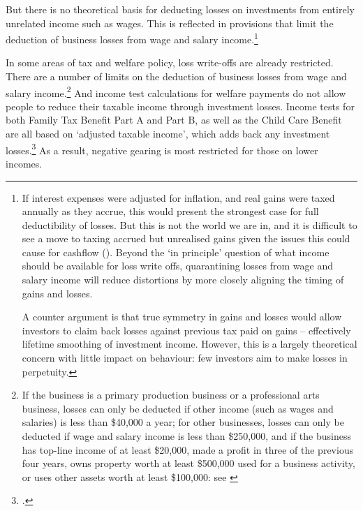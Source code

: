 But there is no theoretical basis for deducting losses on investments from entirely unrelated income such as wages. This is reflected in provisions that limit the deduction of business losses from wage and salary income.\footnote{If interest expenses were adjusted for inflation, and real gains were taxed annually as they accrue, this would present the strongest case for full deductibility of losses. But this is not the world we are in, and it is difficult to see a move to taxing accrued but unrealised gains given the issues this could cause for cashflow (). Beyond the ‘in principle’ question of what income should be available for loss write offs, quarantining losses from wage and salary income will reduce distortions by more closely aligning the timing of gains and losses.

A counter argument is that true symmetry in gains and losses would allow investors to claim back losses against previous tax paid on gains -- effectively lifetime smoothing of investment income. However, this is a largely theoretical concern with little impact on behaviour: few investors aim to make losses in perpetuity.} 

In some areas of tax and welfare policy, loss write-offs are already restricted. 
There are a number of limits on the deduction of business losses from wage and salary income.\footnote{If the business is a primary production business or a professional arts business, losses can only be deducted if other income (such as wages and salaries) is less than \$40,000 a year; for other businesses, losses can only be deducted if wage and salary income is less than \$250,000, and if the business has top-line income of at least \$20,000, made a profit in three of the previous four years, owns property worth at least \$500,000 used for a business activity, or uses other assets worth at least \$100,000: see \textcite{ATO2015OffsettingCurrentYearLosses}}
And income test calculations for welfare payments do not allow people to reduce their taxable income through investment losses. Income tests for both Family Tax Benefit Part A and Part B, as well as the Child Care Benefit are all based on ‘adjusted taxable income’, which adds back any investment losses.\footcite{DHS2015AdjustedTaxableIncome} 
As a result, negative gearing is most restricted for those on lower incomes.

